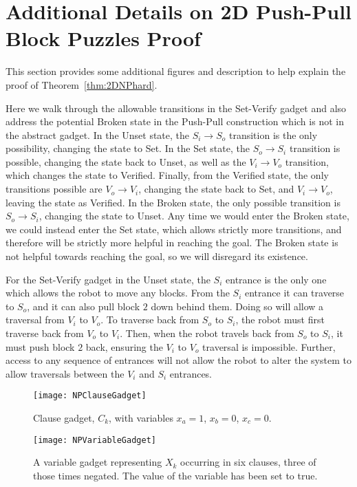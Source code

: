 \section{Additional Details on 2D Push-Pull Block Puzzles Proof}

This section provides some additional figures and description to help explain the proof of Theorem~\ref{thm:2DNPhard}.

Here we walk through the allowable transitions in the Set-Verify gadget and also address the potential Broken state in the Push-Pull construction which is not in the abstract gadget. In the Unset state, the $S_i \rightarrow S_o$ transition is the only possibility, changing the state to Set. In the Set state, the $S_o \rightarrow S_i$ transition is possible, changing the state back to Unset, as well as the $V_i \rightarrow V_o$ transition, which changes the state to Verified. Finally, from the Verified state, the only transitions possible are $V_o \rightarrow V_i$, changing the state back to Set, and $V_i \rightarrow V_o$, leaving the state as Verified. In the Broken state, the only possible transition is $S_o \rightarrow S_i$, changing the state to Unset. Any time we would enter the Broken state, we could instead enter the Set state, which allows strictly more transitions, and therefore will be strictly more helpful in reaching the goal. The Broken state is not helpful towards reaching the goal, so we will disregard its existence.

For the Set-Verify gadget in the Unset state, the $S_i$ entrance is the only one which allows the robot to move any blocks. From the $S_i$ entrance it can traverse to $S_o$, and it can also pull block $2$ down behind them. Doing so will allow a traversal from $V_i$ to $V_o$. To traverse back from $S_o$ to $S_i$, the robot must first traverse back from $V_o$ to $V_i$. Then, when the robot travels back from $S_o$ to $S_i$, it must push block $2$ back, ensuring the $V_i$ to $V_o$ traversal is impossible. Further, access to any sequence of entrances will not allow the robot to alter the system to allow traversals between the $V_i$ and $S_i$ entrances. 

\begin{figure}[!ht]
\begin{minipage}{.36\textwidth}
    \texttt{[image: NPClauseGadget]}
    \caption{Clause gadget, $C_k$, with variables $x_a=1$, $x_b=0$, $x_c=0$.}
    \label{fig:NPClauseGadget}
\end{minipage}
\hspace{5mm}
\begin{minipage}{.57\textwidth}
  \centering
    \texttt{[image: NPVariableGadget]}
    \caption{A variable gadget representing $X_k$ occurring in six clauses, three of those times negated. The value of the variable has been set to true.}
    \label{fig:NPVariableGadget}
\end{minipage}
\end{figure}


